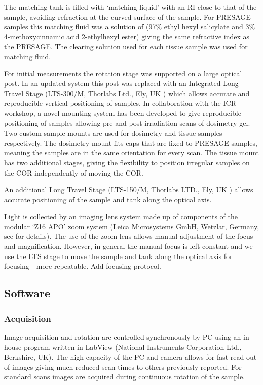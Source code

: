 The matching tank is filled with `matching liquid' with an RI close to that of the sample, avoiding refraction at the curved surface of the sample. For PRESAGE samples this matching fluid was a solution of (97\% ethyl hexyl salicylate and 3\% 4-methoxycinnamic acid 2-ethylhexyl ester) giving the same refractive index as the PRESAGE\textregistered. The clearing solution used for each tissue sample was used for matching fluid.

For initial measurements  the rotation stage was supported on a large optical post. In an updated system this post was replaced with an Integrated Long Travel Stage (LTS-300/M, Thorlabs Ltd., Ely, UK ) which allows  accurate and reproducible vertical positioning of samples. 
In collaboration with the ICR workshop, a novel mounting system has been developed to give reproducible positioning of samples allowing pre and post-irradiation scans of dosimetry gel. 
Two custom sample mounts are used for dosimetry and tissue samples respectively. The dosimetry mount fits caps that are fixed to PRESAGE samples, meaning the samples are in the same orientation for every scan. The tissue mount has two additional stages, giving the flexibility to position irregular samples on the COR independently of moving the COR.  

An additional Long Travel Stage (LTS-150/M, Thorlabs LTD., Ely, UK ) allows accurate positioning of the sample and tank along the optical axis.  

Light is collected by an imaging lens system made up of  components of the modular `Z16 APO' zoom system  (Leica Microsystems GmbH, Wetzlar, Germany, see \cite{Doran:2010hn} for details). The use of the zoom lens allows manual adjustment of the focus and magnification. However, in general the manual focus is left constant and we use the LTS stage to move the sample and tank along the optical axis for focusing - more repeatable. Add focusing protocol.








\subsection{Software}
\subsubsection{Acquisition}

Image acquisition and rotation are controlled synchronously  by PC using an in-house program written in LabView (National Instruments Corporation Ltd., Berkshire, UK). The high capacity of the PC and camera allows for fast read-out of images giving much reduced scan times to others previously reported. For standard scans  images are acquired during continuous rotation of the sample. 

